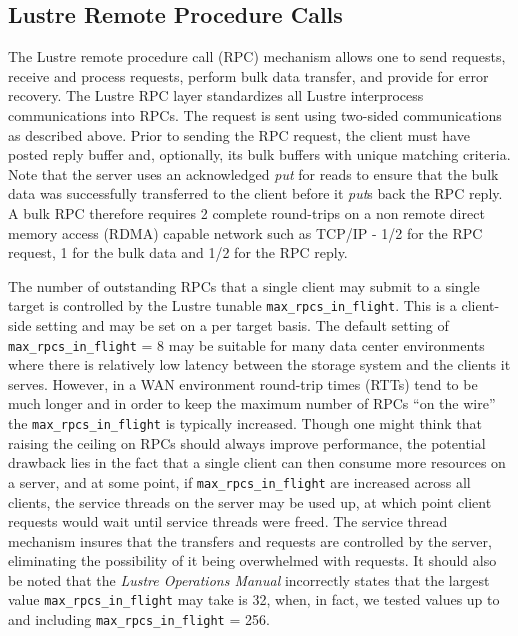 \documentclass[]{sigplan-proc}
\begin{document}
\subsection{Lustre Remote Procedure Calls}

The Lustre remote procedure call (RPC) mechanism allows one to send requests, receive and process requests,
perform bulk data transfer, and provide for error recovery. The Lustre RPC layer standardizes all Lustre
interprocess communications into RPCs. The request is sent using two-sided communications as described above.
Prior to sending the RPC request, the client must have posted reply buffer and, optionally, its bulk buffers
with unique matching criteria. Note that the server uses an acknowledged {\it put} for reads to ensure that
the bulk data was successfully transferred to the client before it {\it put}s back the RPC reply.  A bulk RPC
therefore requires 2 complete round-trips on a non remote direct memory access (RDMA) capable network such as
TCP/IP - 1/2 for the RPC request, 1 for the bulk data and 1/2 for the RPC reply.

The number of outstanding RPCs that a single client may submit to a single target is controlled by the Lustre
tunable {\tt max\_rpcs\_in\_flight}. This is a client-side setting and may be set on a per target basis. The
default setting of {\tt max\_rpcs\_in\_flight} = 8 may be suitable for many data center environments where
there is relatively low latency between the storage system and the clients it serves. However, in a WAN
environment round-trip times (RTTs) tend to be much longer and in order to keep the maximum number of RPCs
``on the wire'' the {\tt max\_rpcs\_in\_flight} is typically increased. Though one might think that raising
the ceiling on RPCs should always improve performance, the potential drawback lies in the fact that a single
client can then consume more resources on a server, and at some point, if {\tt max\_rpcs\_in\_flight} are
increased across all clients, the service threads on the server may be used up, at which point client requests
would wait until service threads were freed. The service thread mechanism insures that the transfers and
requests are controlled by the server, eliminating the possibility of it being overwhelmed with requests.  It
should also be noted that the {\it Lustre Operations Manual} \cite{LustreManual2012} incorrectly states that
the largest value {\tt max\_rpcs\_in\_flight} may take is 32, when, in fact, we tested values up to and
including {\tt max\_rpcs\_in\_flight} = 256.
\end{document}

